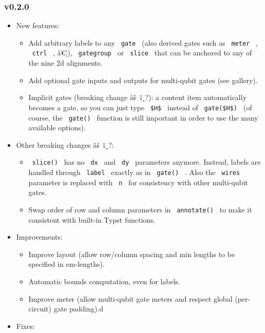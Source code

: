 \subsubsection{v0.2.0}\label{v0.2.0}

\begin{itemize}
\tightlist
\item
  New features:

  \begin{itemize}
  \tightlist
  \item
    Add arbitrary labels to any \texttt{\ gate\ } (also derived gates
    such as \texttt{\ meter\ } , \texttt{\ ctrl\ } , â€¦),
    \texttt{\ gategroup\ } or \texttt{\ slice\ } that can be anchored to
    any of the nine 2d alignments.
  \item
    Add optional gate inputs and outputs for multi-qubit gates (see
    gallery).
  \item
    Implicit gates (breaking change âš~ï¸?): a content item
    automatically becomes a gate, so you can just type
    \texttt{\ \$H\$\ } instead of \texttt{\ gate(\$H\$)\ } (of course,
    the \texttt{\ gate()\ } function is still important in order to use
    the many available options).
  \end{itemize}
\item
  Other breaking changes âš~ï¸?:

  \begin{itemize}
  \tightlist
  \item
    \texttt{\ slice()\ } has no \texttt{\ dx\ } and \texttt{\ dy\ }
    parameters anymore. Instead, labels are handled through
    \texttt{\ label\ } exactly as in \texttt{\ gate()\ } . Also the
    \texttt{\ wires\ } parameter is replaced with \texttt{\ n\ } for
    consistency with other multi-qubit gates.
  \item
    Swap order of row and column parameters in \texttt{\ annotate()\ }
    to make it consistent with built-in Typst functions.
  \end{itemize}
\item
  Improvements:

  \begin{itemize}
  \tightlist
  \item
    Improve layout (allow row/column spacing and min lengths to be
    specified in em-lengths).
  \item
    Automatic bounds computation, even for labels.
  \item
    Improve meter (allow multi-qubit gate meters and respect global
    (per-circuit) gate padding).d
  \end{itemize}
\item
  Fixes:


\end{itemize}
